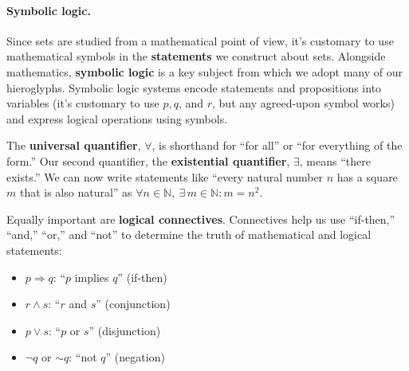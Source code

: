 \paragraph{Symbolic logic.}
Since sets are studied from a mathematical point of view, it's customary to
use mathematical symbols in the \textbf{statements} we construct about sets.
Alongside mathematics, \textbf{symbolic logic} is a key subject from which we
adopt many of our hieroglyphs. Symbolic logic systems encode statements and
propositions into variables (it's customary to use $p, q$, and $r$, but any
agreed-upon symbol works) and express logical operations using symbols.

The \textbf{universal quantifier}, $\forall$, is shorthand for ``for all'' or
``for everything of the form.'' Our second quantifier, the \textbf{existential
quantifier}, $\exists$, means ``there exists.'' We can now write statements
like ``every natural number $n$ has a square $m$ that is also natural'' as
$\forall n \in \mathbb{N},\ \exists\, m \in \mathbb{N} : m = n^2$.

Equally important are \textbf{logical connectives}. Connectives help us use
``if-then,'' ``and,'' ``or,'' and ``not'' to determine the truth of mathematical
and logical statements:
\begin{itemize}[noitemsep]
    \item $p \Rightarrow q$: ``$p$ implies $q$'' (if-then)
    \item $r \wedge s$: ``$r$ and $s$'' (conjunction)
    \item $p \vee s$: ``$p$ or $s$'' (disjunction)
    \item $\neg q$ or $\sim q$: ``not $q$'' (negation)
\end{itemize}


